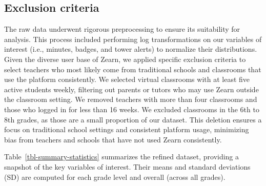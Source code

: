 \documentclass[
  number,
  preprint,
  3p,
  onecolumn]{elsarticle}
\begin{document}
\hypertarget{exclusion-criteria}{%
\subsection{Exclusion criteria}\label{exclusion-criteria}}

The raw data underwent rigorous preprocessing to ensure its suitability
for analysis. This process included performing log transformations on
our variables of interest (i.e., minutes, badges, and tower alerts) to
normalize their distributions. Given the diverse user base of Zearn, we
applied specific exclusion criteria to select teachers who most likely
come from traditional schools and classrooms that use the platform
consistently. We selected virtual classrooms with at least five active
students weekly, filtering out parents or tutors who may use Zearn
outside the classroom setting. We removed teachers with more than four
classrooms and those who logged in for less than 16 weeks. We excluded
classrooms in the 6th to 8th grades, as those are a small proportion of
our dataset. This deletion ensures a focus on traditional school
settings and consistent platform usage, minimizing bias from teachers
and schools that have not used Zearn consistently.

Table~\ref{tbl-summary-statistics} summarizes the refined dataset,
providing a snapshot of the key variables of interest. Their means and
standard deviations (SD) are computed for each grade level and overall
(across all grades).
\end{document}
